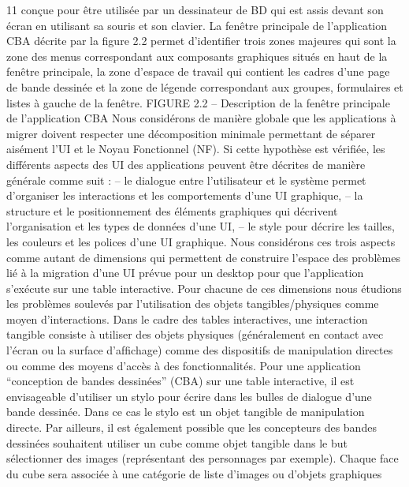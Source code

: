 \documentclass{article}
\begin{document}
11
con\c{c}ue pour \^{e}tre utilis\'{e}e par un dessinateur de BD qui est assis devant son \'{e}cran en utilisant sa souris
et son clavier. La fen\^{e}tre principale de l’application CBA d\'{e}crite par la ﬁgure 2.2 permet d’identiﬁer
trois zones majeures qui sont la zone des menus correspondant aux composants graphiques situ\'{e}s en
haut de la fen\^{e}tre principale, la zone d’espace de travail qui contient les cadres d’une page de bande
dessin\'{e}e et la zone de l\'{e}gende correspondant aux groupes, formulaires et listes \`{a} gauche de la fen\^{e}tre.
FIGURE 2.2 – Description de la fen\^{e}tre principale de l’application CBA
Nous consid\'{e}rons de mani\`{e}re globale que les applications \`{a} migrer doivent respecter une d\'{e}composition minimale permettant de s\'{e}parer ais\'{e}ment l’UI et le Noyau Fonctionnel (NF). Si cette
hypoth\`{e}se est v\'{e}riﬁ\'{e}e, les diff\'{e}rents aspects des UI des applications peuvent \^{e}tre d\'{e}crites de mani\`{e}re
g\'{e}n\'{e}rale comme suit :
– le dialogue entre l’utilisateur et le syst\`{e}me permet d’organiser les interactions et les comportements d’une UI graphique,
– la structure et le positionnement des \'{e}l\'{e}ments graphiques qui d\'{e}crivent l’organisation et les
types de donn\'{e}es d’une UI,
– le style pour d\'{e}crire les tailles, les couleurs et les polices d’une UI graphique.
Nous consid\'{e}rons ces trois aspects comme autant de dimensions qui permettent de construire
l’espace des probl\`{e}mes li\'{e} \`{a} la migration d’une UI pr\'{e}vue pour un desktop pour que l’application
s’ex\'{e}cute sur une table interactive. Pour chacune de ces dimensions nous \'{e}tudions les probl\`{e}mes soulev\'{e}s par l’utilisation des objets tangibles/physiques comme moyen d’interactions. Dans le cadre des
tables interactives, une interaction tangible consiste \`{a} utiliser des objets physiques (g\'{e}n\'{e}ralement
en contact avec l’\'{e}cran ou la surface d’afﬁchage) comme des dispositifs de manipulation directes ou
comme des moyens d’acc\`{e}s \`{a} des fonctionnalit\'{e}s. Pour une application “conception de bandes dessin\'{e}es” (CBA) sur une table interactive, il est envisageable d’utiliser un stylo pour \'{e}crire dans les bulles
de dialogue d’une bande dessin\'{e}e. Dans ce cas le stylo est un objet tangible de manipulation directe.
Par ailleurs, il est \'{e}galement possible que les concepteurs des bandes dessin\'{e}es souhaitent utiliser un
cube comme objet tangible dans le but s\'{e}lectionner des images (repr\'{e}sentant des personnages par
exemple). Chaque face du cube sera associ\'{e}e \`{a} une cat\'{e}gorie de liste d’images ou d’objets graphiques
\end{document}

